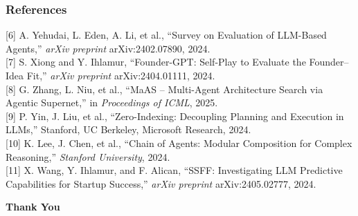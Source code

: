 \documentclass{beamer}
\begin{document}
\begin{frame}
\frametitle{References}
\footnotesize{
[6] A. Yehudai, L. Eden, A. Li, et al., “Survey on Evaluation of LLM-Based Agents,” \textit{arXiv preprint} arXiv:2402.07890, 2024. \\

[7] S. Xiong and Y. Ihlamur, “Founder-GPT: Self-Play to Evaluate the Founder–Idea Fit,” \textit{arXiv preprint} arXiv:2404.01111, 2024. \\

[8] G. Zhang, L. Niu, et al., “MaAS – Multi-Agent Architecture Search via Agentic Supernet,” in \textit{Proceedings of ICML}, 2025. \\

[9] P. Yin, J. Liu, et al., “Zero-Indexing: Decoupling Planning and Execution in LLMs,” Stanford, UC Berkeley, Microsoft Research, 2024. \\

[10] K. Lee, J. Chen, et al., “Chain of Agents: Modular Composition for Complex Reasoning,” \textit{Stanford University}, 2024. \\

[11] X. Wang, Y. Ihlamur, and F. Alican, “SSFF: Investigating LLM Predictive Capabilities for Startup Success,” \textit{arXiv preprint} arXiv:2405.02777, 2024. \\

}
\end{frame}



\begin{frame}
\centering
\Huge \textbf{Thank You}
\end{frame}
\end{document}
